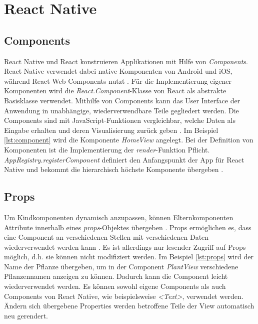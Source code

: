 \section{React Native}

\subsection{Components} \label{component}
React Native und React konstruieren Applikationen mit Hilfe von \textit{Components}. React Native verwendet dabei native Komponenten von Android und iOS, während React Web Components nutzt  \cite{facebook_inc._getting_2017}. Für die Implementierung eigener Komponenten wird die \textit{React.Component}-Klasse von React als abstrakte Basisklasse verwendet. Mithilfe von Components kann das User Interface der Anwendung in unabhängige, wiederverwendbare Teile gegliedert werden. Die Components sind mit JavaScript-Funktionen vergleichbar, welche Daten als Eingabe erhalten und deren Visualisierung zurück geben \cite{facebook_inc._components_2017}. Im Beispiel \ref{lst:component} wird die Komponente \textit{HomeView} angelegt. Bei der Definition von Komponenten ist die Implementierung der \textit{render}-Funktion Pflicht. \textit{AppRegistry.registerComponent} definiert den Anfangspunkt der App für React Native und bekommt die hierarchisch höchste Komponente übergeben \cite{facebook_inc._getting_2017}. 

\subsection{Props}
Um Kindkomponenten dynamisch anzupassen, können Elternkomponenten Attribute innerhalb eines \textit{props}-Objektes übergeben \cite{facebook_inc._components_2017}. Props ermöglichen es, dass eine Component an verschiedenen Stellen mit verschiedenen Daten wiederverwendet werden kann \cite{facebook_inc._props_2017}. Es ist allerdings nur lesender Zugriff auf Props möglich, d.h. sie können nicht modifiziert werden. Im Beispiel \ref{lst:props} wird der Name der Pflanze übergeben, um in der Component \textit{PlantView} verschiedene Pflanzennamen anzeigen zu können. Dadurch kann die Component leicht wiederverwendet werden. Es können sowohl eigene Components als auch Components von React Native, wie beispielsweise \textit{<Text>}, verwendet werden. Ändern sich übergebene Properties werden betroffene Teile der View automatisch neu gerendert.

